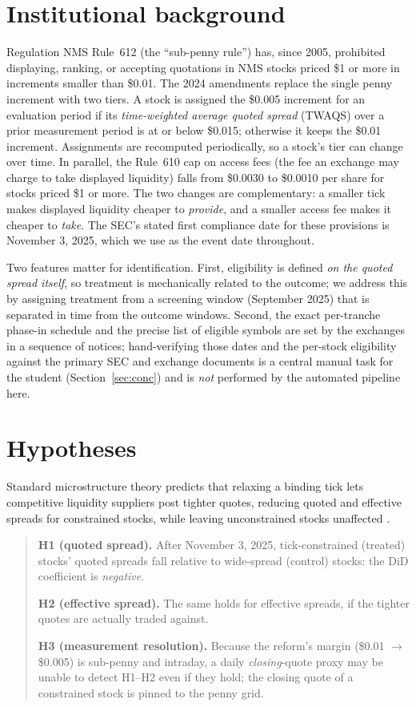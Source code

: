 \documentclass[12pt]{article}
\begin{document}
\section{Institutional background}\label{sec:inst}
Regulation NMS Rule~612 (the ``sub-penny rule'') has, since 2005, prohibited displaying,
ranking, or accepting quotations in NMS stocks priced \$1 or more in increments smaller
than \$0.01. The 2024 amendments replace the single penny increment with two tiers. A stock
is assigned the \$0.005 increment for an evaluation period if its \emph{time-weighted
average quoted spread} (TWAQS) over a prior measurement period is at or below \$0.015;
otherwise it keeps the \$0.01 increment. Assignments are recomputed periodically, so a
stock's tier can change over time. In parallel, the Rule~610 cap on access fees (the fee an
exchange may charge to take displayed liquidity) falls from \$0.0030 to \$0.0010 per share
for stocks priced \$1 or more. The two changes are complementary: a smaller tick makes
displayed liquidity cheaper to \emph{provide}, and a smaller access fee makes it cheaper to
\emph{take}. The SEC's stated first compliance date for these provisions is November 3,
2025, which we use as the event date throughout.

Two features matter for identification. First, eligibility is defined \emph{on the quoted
spread itself}, so treatment is mechanically related to the outcome; we address this by
assigning treatment from a screening window (September 2025) that is separated in time from
the outcome windows. Second, the exact per-tranche phase-in schedule and the precise list of
eligible symbols are set by the exchanges in a sequence of notices; hand-verifying those
dates and the per-stock eligibility against the primary SEC and exchange documents is a
central manual task for the student (Section~\ref{sec:conc}) and is \emph{not} performed by
the automated pipeline here.

\section{Hypotheses}\label{sec:hyp}
Standard microstructure theory predicts that relaxing a binding tick lets competitive
liquidity suppliers post tighter quotes, reducing quoted and effective spreads for
constrained stocks, while leaving unconstrained stocks unaffected
\citep{harris1994,foucault2013}.

\begin{quote}
\textbf{H1 (quoted spread).} After November 3, 2025, tick-constrained (treated) stocks'
quoted spreads fall relative to wide-spread (control) stocks: the DiD coefficient is
\emph{negative}.

\textbf{H2 (effective spread).} The same holds for effective spreads, if the tighter
quotes are actually traded against.

\textbf{H3 (measurement resolution).} Because the reform's margin (\$0.01 $\to$ \$0.005) is
sub-penny and intraday, a daily \emph{closing}-quote proxy may be unable to detect
H1--H2 even if they hold; the closing quote of a constrained stock is pinned to the penny
grid.
\end{quote}
\end{document}
